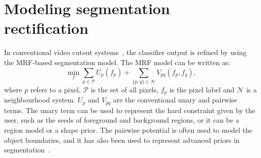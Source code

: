 \documentclass[10pt,journal,compsoc]{newIEEEtran}
\begin{document}
\section{Modeling segmentation rectification}\label{sec:bilayerMRF}%

In conventional video cutout systems~\cite{Bai09VideoSnapCut_SIGGRAPH,Zhong2012UDC_SIGGRAPHAsia}, the classifier output is refined by using the MRF-based segmentation model. The MRF model can be written as:
\begin{equation}\label{eqn:MRF_prior}
\min_{f} \sum_{p\in\mathcal{P}} U_{p}(f_p) + \sum_{\{p,q\}\in \mathcal{N}} V_{pq}(f_p,f_q), %
\end{equation}
where $p$ refers to a  pixel, $\mathcal{P}$ is the set of all pixels, $f_p$ is the pixel label and $\mathcal{N}$ is a neighbourhood system. $U_p$ and $V_{pq}$ are the conventional unary and pairwise terms. The unary term can be used to represent the hard constraint given by the user, such as the seeds of foreground and background regions, or it can be a region model or a shape prior. The pairwise potential is often used to model the object boundaries, and it has also been used to represent advanced priors in segmentation~\cite{Veksler08StarShapePrior}.
\end{document}
